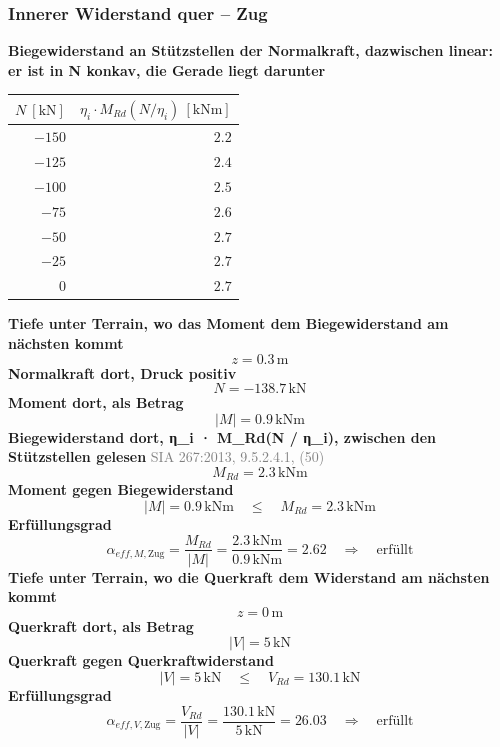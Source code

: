 \documentclass[11pt,a4paper]{article}
\newcommand{\normref}[1]{{\small\textcolor{gray}{#1}}}
\begin{document}
\subsubsection{Innerer Widerstand quer – Zug}
\noindent\textbf{Biegewiderstand an Stützstellen der Normalkraft, dazwischen linear: er ist in N konkav, die Gerade liegt darunter}
\begin{longtable}{rr}
\hline
$N\ [\mathrm{kN}]$ & $\eta_i \cdot M_{Rd}(N / \eta_i)\ [\mathrm{kNm}]$ \\
\hline
\endhead
$-150$ & $2.2$ \\
$-125$ & $2.4$ \\
$-100$ & $2.5$ \\
$-75$ & $2.6$ \\
$-50$ & $2.7$ \\
$-25$ & $2.7$ \\
$0$ & $2.7$ \\
\hline
\end{longtable}
\noindent\textbf{Tiefe unter Terrain, wo das Moment dem Biegewiderstand am nächsten kommt}
\begin{equation*}
z = 0.3\,\mathrm{m}
\end{equation*}
\noindent\textbf{Normalkraft dort, Druck positiv}
\begin{equation*}
N = -138.7\,\mathrm{kN}
\end{equation*}
\noindent\textbf{Moment dort, als Betrag}
\begin{equation*}
\left|M\right| = 0.9\,\mathrm{kNm}
\end{equation*}
\noindent\textbf{Biegewiderstand dort, η\_i · M\_Rd(N / η\_i), zwischen den Stützstellen gelesen} \hfill \normref{SIA 267:2013, 9.5.2.4.1, (50)}
\begin{equation*}
M_{Rd} = 2.3\,\mathrm{kNm}
\end{equation*}
\noindent\textbf{Moment gegen Biegewiderstand}
\begin{equation*}
\left|M\right| = 0.9\,\mathrm{kNm} \quad \le \quad M_{Rd} = 2.3\,\mathrm{kNm}
\end{equation*}
\noindent\textbf{Erfüllungsgrad}
\begin{equation*}
\alpha_{eff,M,\text{Zug}} = \frac{M_{Rd}}{\left|M\right|} = \frac{2.3\,\mathrm{kNm}}{0.9\,\mathrm{kNm}} = 2.62 \quad \Rightarrow \quad \text{erfüllt}
\end{equation*}
\noindent\textbf{Tiefe unter Terrain, wo die Querkraft dem Widerstand am nächsten kommt}
\begin{equation*}
z = 0\,\mathrm{m}
\end{equation*}
\noindent\textbf{Querkraft dort, als Betrag}
\begin{equation*}
\left|V\right| = 5\,\mathrm{kN}
\end{equation*}
\noindent\textbf{Querkraft gegen Querkraftwiderstand}
\begin{equation*}
\left|V\right| = 5\,\mathrm{kN} \quad \le \quad V_{Rd} = 130.1\,\mathrm{kN}
\end{equation*}
\noindent\textbf{Erfüllungsgrad}
\begin{equation*}
\alpha_{eff,V,\text{Zug}} = \frac{V_{Rd}}{\left|V\right|} = \frac{130.1\,\mathrm{kN}}{5\,\mathrm{kN}} = 26.03 \quad \Rightarrow \quad \text{erfüllt}
\end{equation*}
\end{document}
